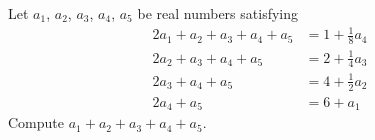 Let $a_1$, $a_2$, $a_3$, $a_4$, $a_5$ be real numbers satisfying
\begin{align*}
	2a_1+a_2+a_3+a_4+a_5 &= 1 + \tfrac{1}{8}a_4 \\
	    2a_2+a_3+a_4+a_5 &= 2 + \tfrac{1}{4}a_3 \\
	        2a_3+a_4+a_5 &= 4 + \tfrac{1}{2}a_2 \\
	            2a_4+a_5 &= 6 + a_1
\end{align*}
Compute $a_1+a_2+a_3+a_4+a_5$.
